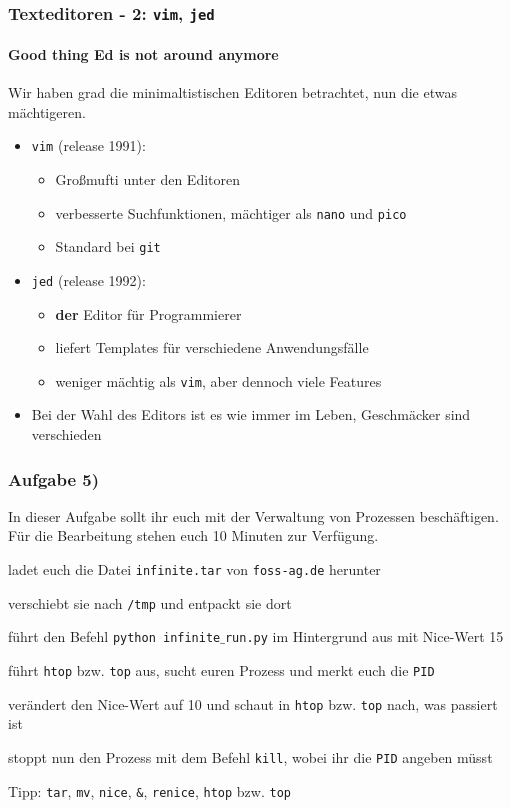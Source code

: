 \documentclass[12pt,utf8]{beamer}
\begin{document}
\begin{frame}
\frametitle{Texteditoren - 2: \texttt{vim}, \texttt{jed}}
\framesubtitle{\textcolor{ownDarkOr}{Good thing Ed is not around anymore}}
Wir haben grad die minimaltistischen Editoren betrachtet, nun die etwas mächtigeren.
\begin{itemize}
	\item \texttt{vim} (release 1991):
	\begin{itemize}[<+->]
		\item Großmufti unter den Editoren
		\item verbesserte Suchfunktionen, mächtiger als \texttt{nano} und \texttt{pico}
		\item Standard bei \texttt{git}
	\end{itemize}
	\item \texttt{jed} (release 1992):
	\begin{itemize}[<+->]
		\item \textbf{der} Editor für Programmierer
		\item liefert Templates für verschiedene Anwendungsfälle
		\item weniger mächtig als \texttt{vim}, aber dennoch viele Features
	\end{itemize}
	\item Bei der Wahl des Editors ist es wie immer im Leben, Geschmäcker sind verschieden
\end{itemize}
\end{frame}

\begin{frame}
\frametitle{Aufgabe 5)}
In dieser Aufgabe sollt ihr euch mit der Verwaltung von Prozessen beschäftigen.
Für die Bearbeitung stehen euch 10 Minuten zur Verfügung.
\begin{itemize}
	{\footnotesize
	\item ladet euch die Datei \texttt{infinite.tar} von \texttt{foss-ag.de} herunter
	\item verschiebt sie nach \texttt{/tmp} und entpackt sie dort
	\item führt den Befehl \texttt{python infinite$\_$run.py} im Hintergrund aus mit Nice-Wert 15
	\item führt \texttt{htop} bzw. \texttt{top} aus, sucht euren Prozess und merkt euch die \texttt{PID}
	\item verändert den Nice-Wert auf 10 und schaut in \texttt{htop} bzw. \texttt{top} nach, was passiert ist
	\item stoppt nun den Prozess mit dem Befehl \texttt{kill}, wobei ihr die \texttt{PID} angeben müsst
	}
\end{itemize}
{\scriptsize Tipp: \texttt{tar}, \texttt{mv}, \texttt{nice}, \texttt{\&}, \texttt{renice}, \texttt{htop} bzw. \texttt{top}}
\end{frame}
\end{document}
